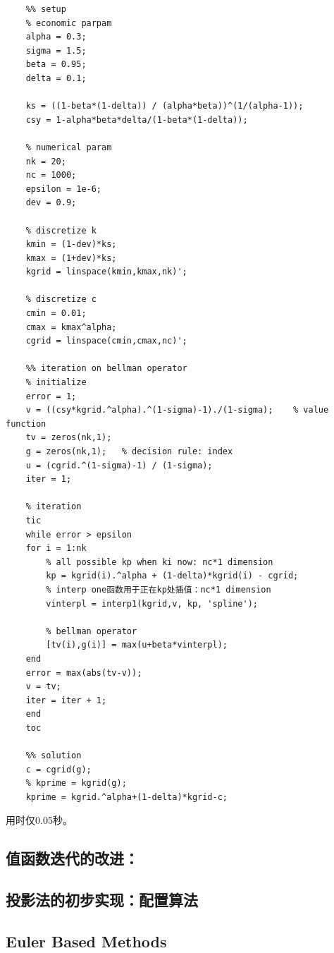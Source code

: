 \begin{lstlisting}
    %% setup
    % economic parpam
    alpha = 0.3;
    sigma = 1.5;
    beta = 0.95;
    delta = 0.1;

    ks = ((1-beta*(1-delta)) / (alpha*beta))^(1/(alpha-1));
    csy	= 1-alpha*beta*delta/(1-beta*(1-delta));

    % numerical param
    nk = 20;
    nc = 1000;
    epsilon = 1e-6;
    dev = 0.9;

    % discretize k
    kmin = (1-dev)*ks;
    kmax = (1+dev)*ks;
    kgrid = linspace(kmin,kmax,nk)';

    % discretize c
    cmin = 0.01;
    cmax = kmax^alpha;
    cgrid = linspace(cmin,cmax,nc)';

    %% iteration on bellman operator
    % initialize
    error = 1;
    v = ((csy*kgrid.^alpha).^(1-sigma)-1)./(1-sigma);    % value function
    tv = zeros(nk,1);
    g = zeros(nk,1);   % decision rule: index
    u = (cgrid.^(1-sigma)-1) / (1-sigma);
    iter = 1;

    % iteration
    tic
    while error > epsilon
    for i = 1:nk
        % all possible kp when ki now: nc*1 dimension
        kp = kgrid(i).^alpha + (1-delta)*kgrid(i) - cgrid; 
        % interp one函数用于正在kp处插值：nc*1 dimension
        vinterpl = interp1(kgrid,v, kp, 'spline'); 
        
        % bellman operator
        [tv(i),g(i)] = max(u+beta*vinterpl);
    end
    error = max(abs(tv-v));
    v = tv;
    iter = iter + 1;
    end
    toc

    %% solution
    c = cgrid(g);
    % kprime = kgrid(g);
    kprime = kgrid.^alpha+(1-delta)*kgrid-c;
\end{lstlisting}

用时仅0.05秒。


\subsection{值函数迭代的改进：}



\subsection{投影法的初步实现：配置算法}



\subsection{Euler Based Methods}



